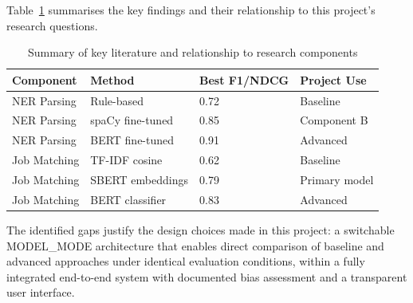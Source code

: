 Table~\ref{tab:litcomp} summarises the key findings and their relationship to this project's research questions.

\begin{table}[H]
\centering
\caption{Summary of key literature and relationship to research components}
\label{tab:litcomp}
\begin{tabular}{@{}llll@{}}
\toprule
\textbf{Component} & \textbf{Method} & \textbf{Best F1/NDCG} & \textbf{Project Use} \\
\midrule
NER Parsing & Rule-based & 0.72 & Baseline \\
NER Parsing & spaCy fine-tuned & 0.85 & Component B \\
NER Parsing & BERT fine-tuned & 0.91 & Advanced \\
\midrule
Job Matching & TF-IDF cosine & 0.62 & Baseline \\
Job Matching & SBERT embeddings & 0.79 & Primary model \\
Job Matching & BERT classifier & 0.83 & Advanced \\
\bottomrule
\end{tabular}
\end{table}

The identified gaps justify the design choices made in this project: a switchable MODEL\_MODE architecture that enables direct comparison of baseline and advanced approaches under identical evaluation conditions, within a fully integrated end-to-end system with documented bias assessment and a transparent user interface.
